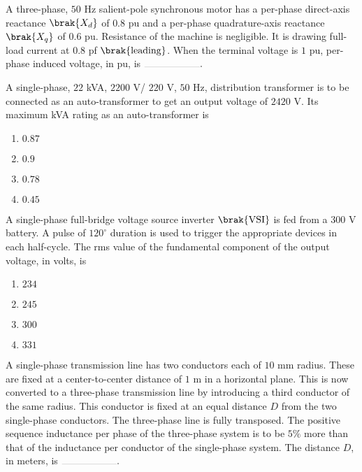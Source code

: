 \item A three-phase, $50$ Hz salient-pole synchronous motor has a per-phase direct-axis reactance $\brak{X_d}$ of $0.8$ pu and a per-phase quadrature-axis reactance $\brak{X_q}$ of $0.6$ pu. Resistance of the machine is negligible. It is drawing full-load current at $0.8$ pf $\brak{\text{leading}}$. When the terminal voltage is $1$ pu, per-phase induced voltage, in pu, is $\rule{2cm}{0.1pt}.$
\hfill{}

\item A single-phase, $22$ kVA, $2200$ V/ $220$ V, $50$ Hz, distribution transformer is to be connected as an auto-transformer to get an output voltage of $2420$ V. Its maximum kVA rating as an auto-transformer is
\hfill{}
\begin{enumerate}
\item $0.87$
\item $0.9$
\item $0.78$
\item $0.45$
\end{enumerate}

\item A single-phase full-bridge voltage source inverter $\brak{\text{VSI}}$ is fed from a $300$ V battery. A pulse of $120^\circ$ duration is used to trigger the appropriate devices in each half-cycle. The rms value of the fundamental component of the output voltage, in volts, is
\hfill{}
\begin{enumerate}
\item $234$
\item $245$
\item $300$
\item $331$
\end{enumerate}

\item A single-phase transmission line has two conductors each of $10$ mm radius. These are fixed at a center-to-center distance of $1$ m in a horizontal plane. This is now converted to a three-phase transmission line by introducing a third conductor of the same radius. This conductor is fixed at an equal distance $D$ from the two single-phase conductors. The three-phase line is fully transposed. The positive sequence inductance per phase of the three-phase system is to be $5\%$ more than that of the inductance per conductor of the single-phase system. The distance $D$, in meters, is $\rule{2cm}{0.1pt}.$
\hfill{}

